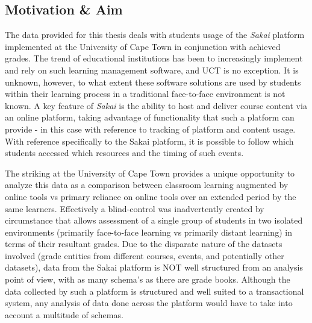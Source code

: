 \subsection{Motivation \& Aim}
The data provided for this thesis deals with students usage of the \textit{Sakai} platform implemented at the University of Cape Town in conjunction with achieved grades. The trend of educational institutions has been to increasingly implement and rely on such learning management software, and UCT is no exception. It is unknown, however, to what extent these software solutions are used by students within their learning process in a traditional face-to-face environment is not known. A key feature of \textit{Sakai} is the ability to host and deliver course content via an online platform, taking advantage of functionality that such a platform can provide - in this case with reference to tracking of platform and content usage. With reference specifically to the Sakai platform, it is possible to follow which students accessed which resources and the timing of such events.

The striking at the University of Cape Town provides a unique opportunity to analyze this data as a comparison between classroom learning augmented by online tools vs primary reliance on online tools over an extended period by the same learners. Effectively a blind-control was inadvertently created by circumstance that allows assessment of a single group of students in two isolated environments (primarily face-to-face learning vs primarily distant learning) in terms of their resultant grades. Due to the disparate nature of the datasets involved (grade entities from different courses, events, and potentially other datasets), data from the Sakai platform is NOT well structured from an analysis point of view, with as many schema's as there are grade books. Although the data collected by such a platform is structured and well suited to a transactional system, any analysis of data done across the platform would have to take into account a multitude of schemas.

